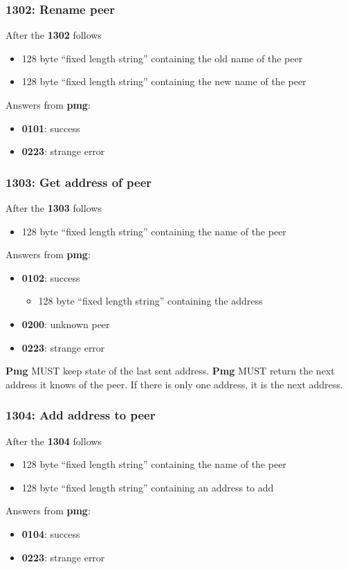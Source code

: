 \documentclass[12pt,a4paper]{book}
\begin{document}
\subsubsection{1302: Rename peer}
After the \textbf{1302} follows
\begin{itemize}
\item 128 byte "`fixed length string"' containing the old name of the peer
\item 128 byte "`fixed length string"' containing the new name of the peer
\end{itemize}
Answers from \textbf{pmg}:
\begin{itemize}
\item \textbf{0101}: success
\item \textbf{0223}: strange error
\end{itemize}
\subsubsection{1303: Get address of peer}
After the \textbf{1303} follows
\begin{itemize}
\item 128 byte "`fixed length string"' containing the name of the peer
\end{itemize}
Answers from \textbf{pmg}:
\begin{itemize}
\item \textbf{0102}: success
\begin{itemize}
\item 128 byte "`fixed length string"' containing the address
\end{itemize}
\item \textbf{0200}: unknown peer
\item \textbf{0223}: strange error
\end{itemize}
\textbf{Pmg} MUST keep state of the last sent address.
\textbf{Pmg} MUST return the next address it knows of the peer.
If there is only one address, it is the next address.
\subsubsection{1304: Add address to peer}
After the \textbf{1304} follows
\begin{itemize}
\item 128 byte "`fixed length string"' containing the name of the peer
\item 128 byte "`fixed length string"' containing an address to add
\end{itemize}
Answers from \textbf{pmg}:
\begin{itemize}
\item \textbf{0104}: success
\item \textbf{0223}: strange error
\end{itemize}
\end{document}
